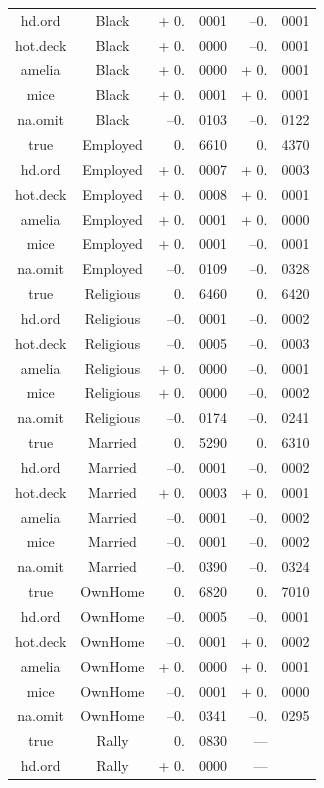 \documentclass[12pt,econ]{sources/authesis}
\begin{document}
\begin{longtable}{ccr@{}lr@{}l}
 hd.ord & Black & + 0.&0001 & --0.&0001 \\
 hot.deck & Black & + 0.&0000 & --0.&0001 \\
 amelia & Black & + 0.&0000 & + 0.&0001 \\ 
 mice & Black & + 0.&0001 & + 0.&0001 \\ 
 na.omit & Black & --0.&0103 & --0.&0122 \\ 
 true & Employed & 0.&6610 & 0.&4370 \\
 hd.ord & Employed & + 0.&0007 & + 0.&0003 \\
 hot.deck & Employed & + 0.&0008 & + 0.&0001 \\ 
 amelia & Employed & + 0.&0001 & + 0.&0000 \\
 mice & Employed & + 0.&0001 & --0.&0001 \\
 na.omit & Employed & --0.&0109 & --0.&0328 \\
 true & Religious & 0.&6460 & 0.&6420 \\ 
 hd.ord & Religious & --0.&0001 & --0.&0002 \\ 
 hot.deck & Religious & --0.&0005 & --0.&0003 \\ 
 amelia & Religious & + 0.&0000 & --0.&0001 \\
 mice & Religious & + 0.&0000 & --0.&0002 \\
 na.omit & Religious & --0.&0174 & --0.&0241 \\ 
 true & Married & 0.&5290 & 0.&6310 \\ 
 hd.ord & Married & --0.&0001 & --0.&0002 \\ 
 hot.deck & Married & + 0.&0003 & + 0.&0001 \\ 
 amelia & Married & --0.&0001 & --0.&0002 \\ 
 mice & Married & --0.&0001 & --0.&0002 \\ 
 na.omit & Married & --0.&0390 & --0.&0324 \\ 
 true & OwnHome & 0.&6820 & 0.&7010 \\ 
 hd.ord & OwnHome & --0.&0005 & --0.&0001 \\
 hot.deck & OwnHome & --0.&0001 & + 0.&0002 \\ 
 amelia & OwnHome & + 0.&0000 & + 0.&0001 \\
 mice & OwnHome & --0.&0001 & + 0.&0000 \\
 na.omit & OwnHome & --0.&0341 & --0.&0295 \\
 true & Rally & 0.&0830 & --- \\ 
 hd.ord & Rally & + 0.&0000 & --- \\ 

\end{longtable}
\end{document}
